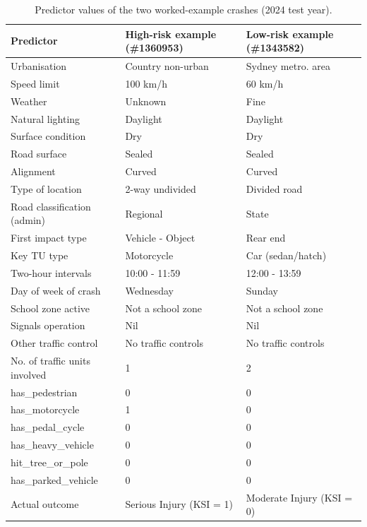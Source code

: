 \documentclass[11pt,a4paper]{article}
\begin{document}
\begin{table}[H]
\centering
\caption{Predictor values of the two worked-example crashes (2024 test year).}
\label{tab:example_inputs}
\footnotesize
\begin{tabularx}{\textwidth}{@{}P{4.6cm}LL@{}}
\toprule
\textbf{Predictor} & \textbf{High-risk example (\#1360953)} & \textbf{Low-risk example (\#1343582)} \\
\midrule
Urbanisation & Country non-urban & Sydney metro. area \\
Speed limit & 100 km/h & 60 km/h \\
Weather & Unknown & Fine \\
Natural lighting & Daylight & Daylight \\
Surface condition & Dry & Dry \\
Road surface & Sealed & Sealed \\
Alignment & Curved & Curved \\
Type of location & 2-way undivided & Divided road \\
Road classification (admin) & Regional & State \\
First impact type & Vehicle - Object & Rear end \\
Key TU type & Motorcycle & Car (sedan/hatch) \\
Two-hour intervals & 10:00 - 11:59 & 12:00 - 13:59 \\
Day of week of crash & Wednesday & Sunday \\
School zone active & Not a school zone & Not a school zone \\
Signals operation & Nil & Nil \\
Other traffic control & No traffic controls & No traffic controls \\
No. of traffic units involved & 1 & 2 \\
has\_pedestrian & 0 & 0 \\
has\_motorcycle & 1 & 0 \\
has\_pedal\_cycle & 0 & 0 \\
has\_heavy\_vehicle & 0 & 0 \\
hit\_tree\_or\_pole & 0 & 0 \\
has\_parked\_vehicle & 0 & 0 \\
\midrule
Actual outcome & Serious Injury (KSI = 1) & Moderate Injury (KSI = 0) \\
\bottomrule
\end{tabularx}
\end{table}
\end{document}
